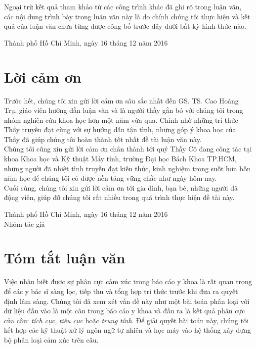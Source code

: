 \documentclass[a4paper, 12pt]{article}
\theoremstyle{definition}
\newcommand{\tichcuc}{\textit{tích cực}\xspace}
\newcommand{\tieucuc}{\textit{tiêu cực}\xspace}
\newcommand{\trungtinh}{\textit{trung tính}\xspace}
\begin{document}
Ngoại trừ kết quả tham khảo từ các công trình khác đã ghi rõ trong luận văn, các nội dung trình bày trong luận văn này là do chính chúng tôi thực hiện và kết quả của luận văn chưa từng được công bố trước đây dưới bất kỳ hình thức nào.\\

\begin{flushright}
Thành phố Hồ Chí Minh, ngày 16 tháng 12 năm 2016
\end{flushright}

\pagebreak
\section*{Lời cảm ơn}
Trước hết, chúng tôi xin gửi lời cám ơn sâu sắc nhất đến GS. TS. Cao Hoàng Trụ, giáo viên hướng dẫn luận văn và là người thầy gắn bó với chúng tôi trong nhóm nghiên cứu khoa học hơn một năm vừa qua. Chính nhờ những tri thức Thầy truyền đạt cùng với sự hướng dẫn tận tình, những góp ý khoa học của Thầy đã giúp chúng tôi hoàn thành tốt nhất đề tài luận văn này.\\

Chúng tôi cũng xin gửi lời cảm ơn chân thành tới quý Thầy Cô đang công tác tại khoa Khoa học và Kỹ thuật Máy tính, trường Đại học Bách Khoa TP.HCM, những người đã nhiệt tình truyền đạt kiến thức, kinh nghiệm trong suốt hơn bốn năm học để chúng tôi có được nền tảng vững chắc như ngày hôm nay.\\

Cuối cùng, chúng tôi xin gửi lời cảm ơn tới gia đình, bạn bè, những người đã động viên, giúp đỡ chúng tôi rất nhiều trong quá trình thực hiện đề tài này.\\

\begin{flushright}
Thành phố Hồ Chí Minh, ngày 16 tháng 12 năm 2016\\

Nhóm tác giả
\end{flushright}

\pagebreak
\section*{Tóm tắt luận văn}
Việc nhận biết được sự phân cực cảm xúc trong báo cáo y khoa là rất quan trọng để các y bác sĩ sàng lọc, tiếp thu và tổng hợp tri thức trước khi đưa ra quyết định lâm sàng. Chúng tôi đã xem xét vấn đề này như một bài toán phân loại với dữ liệu đầu vào là một câu trong báo cáo y khoa và đầu ra là kết quả phân cực của câu: \tichcuc, \tieucuc hoặc \trungtinh. Để giải quyết bài toán này, chúng tôi kết hợp các kỹ thuật xử lý ngôn ngữ tự nhiên và học máy vào hệ thống xây dựng bộ phân loại cảm xúc trên câu.\\
\end{document}
